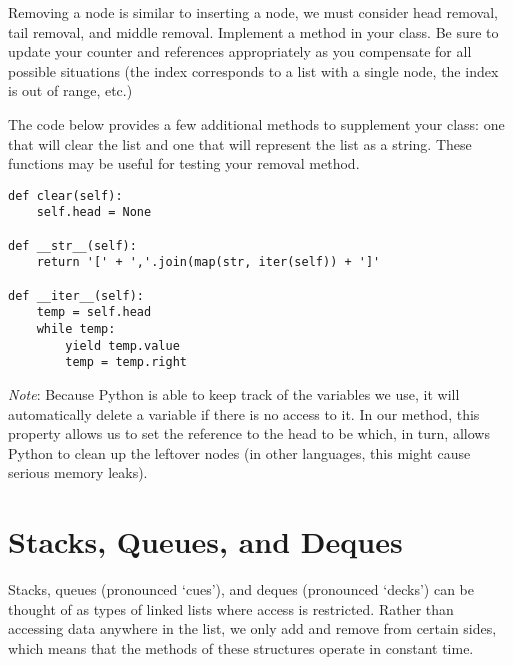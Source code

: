 \begin{problem}
Removing a node is similar to inserting a node, we must consider head removal, tail removal, and middle removal.
Implement a  method in your  class.
Be sure to update your counter and references appropriately as you compensate for all possible situations  (the index corresponds to a list with a single node, the index is out of range, etc.)

The code below provides a few additional methods to supplement your  class: one that will clear the list and one that will represent the list as a string.
These functions may be useful for testing your removal method.
\begin{lstlisting}
def clear(self):
    self.head = None

def __str__(self):
    return '[' + ','.join(map(str, iter(self)) + ']'
    
def __iter__(self):
    temp = self.head
    while temp:
        yield temp.value
        temp = temp.right
\end{lstlisting}
\emph{Note}: Because Python is able to keep track of the variables we use, it will automatically delete a variable if there is no access to it.
In our  method, this property allows us to set the reference to the head to be  which, in turn, allows Python to clean up the leftover nodes (in other languages, this might cause serious memory leaks).
\label{prob:LinkedList}
\end{problem}

\section*{Stacks, Queues, and Deques}
Stacks, queues (pronounced `cues'), and deques (pronounced `decks') can be thought of as types of linked lists where access is restricted.
Rather than accessing data anywhere in the list, we only add and remove from certain sides, which means that the methods of these structures operate in constant time.

